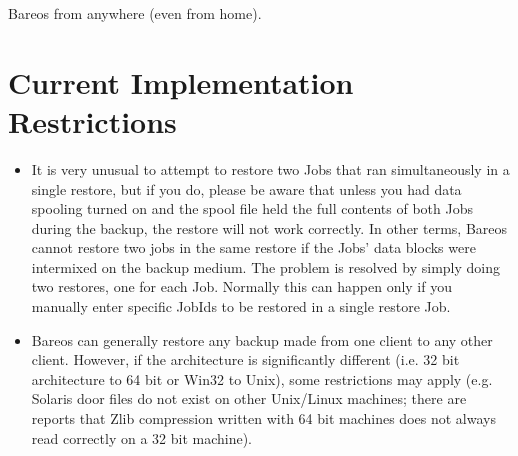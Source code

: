 \begin{itemize}
   Bareos from anywhere (even from home).

\end{itemize}

\section{Current Implementation Restrictions}

\begin{itemize}
\item It is very unusual to attempt to restore two Jobs
   that ran simultaneously in a single restore, but if
   you do, please be aware that unless you had
   data spooling turned on and the spool file held the full
   contents of both Jobs during the backup, the restore will not
   work correctly. In other terms, Bareos cannot restore
   two jobs in the same restore if the Jobs' data blocks were
   intermixed on the backup medium. The problem is resolved by
   simply doing two restores, one for each Job.
   Normally this can happen only if you manually enter specific
   JobIds to be restored in a single restore Job.
\item Bareos can generally restore any backup made from one client
   to any other client. However, if the architecture is significantly
   different (i.e. 32 bit architecture to 64 bit or Win32 to Unix),
   some restrictions may apply (e.g. Solaris door files do not exist
   on other Unix/Linux machines; there are reports that Zlib compression
   written with 64 bit machines does not always read correctly on a 32 bit
   machine).
\end{itemize}

